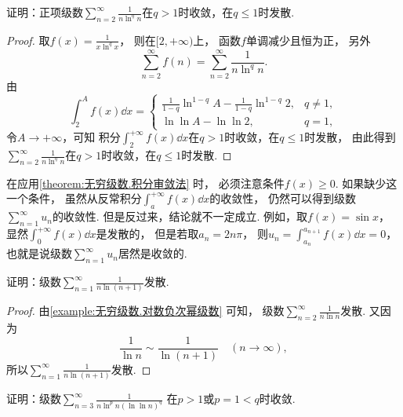 \begin{example}\label{example:无穷级数.对数负次幂级数}
证明：正项级数\(\sum_{n=2}^\infty \frac1{n \ln^q n}\)在\(q>1\)时收敛，在\(q\leq1\)时发散.
\begin{proof}
取\(f(x) = \frac1{x \ln^q x}\)，
则在\([2,+\infty)\)上，
函数\(f\)单调减少且恒为正，
另外\[
	\sum_{n=2}^\infty f(n)
	= \sum_{n=2}^\infty \frac1{n \ln^q n}.
\]
由\[
	\int_2^A f(x) \dd{x}
	= \left\{ \begin{array}{ll}
		\frac1{1-q} \ln^{1-q} A - \frac1{1-q} \ln^{1-q}2, & q\neq1, \\
		\ln\ln A - \ln\ln 2, & q=1,
	\end{array} \right.
\]
令\(A\to+\infty\)，可知
积分\(\int_2^{+\infty} f(x) \dd{x}\)在\(q>1\)时收敛，在\(q\leq1\)时发散，
由此得到\(\sum_{n=2}^\infty \frac1{n \ln^q n}\)在\(q>1\)时收敛，在\(q\leq1\)时发散.
\end{proof}
\end{example}

\begin{remark}
在应用\cref{theorem:无穷级数.积分审敛法} 时，
必须注意条件\(f(x)\geq0\).
如果缺少这一个条件，
虽然从反常积分\(\int_a^{+\infty} f(x) \dd{x}\)的收敛性，
仍然可以得到级数\(\sum_{n=1}^\infty u_n\)的收敛性.
但是反过来，结论就不一定成立.
例如，取\(f(x) = \sin x\)，
显然\(\int_0^{+\infty} f(x) \dd{x}\)是发散的，
但是若取\(a_n = 2n\pi\)，
则\(u_n = \int_{a_n}^{a_{n+1}} f(x) \dd{x} = 0\)，
也就是说级数\(\sum_{n=1}^\infty u_n\)居然是收敛的.
\end{remark}

\begin{example}
证明：级数\(\sum_{n=1}^\infty \frac1{n \ln(n+1)}\)发散.
\begin{proof}
由\cref{example:无穷级数.对数负次幂级数} 可知，
级数\(\sum_{n=2}^\infty \frac1{n \ln n}\)发散.
又因为\[
	\frac1{\ln n} \sim \frac1{\ln(n+1)}
	\quad(n\to\infty),
\]
所以\(\sum_{n=1}^\infty \frac1{n \ln(n+1)}\)发散.
\end{proof}
\end{example}

\begin{example}
证明：级数\(\sum_{n=3}^\infty \frac1{n \ln^p n (\ln\ln n)^q}\)
在\(p>1\)或\(p=1<q\)时收敛.
\end{example}

